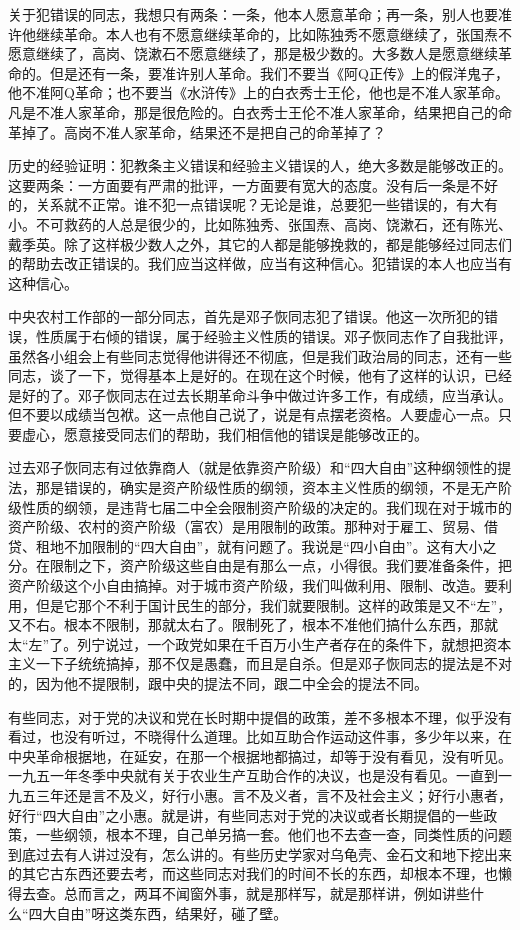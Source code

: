 关于犯错误的同志，我想只有两条：一条，他本人愿意革命；再一条，别人也要准许他继续革命。本人也有不愿意继续革命的，比如陈独秀不愿意继续了，张国焘不愿意继续了，高岗、饶漱石不愿意继续了，那是极少数的。大多数人是愿意继续革命的。但是还有一条，要准许别人革命。我们不要当《阿Q正传》上的假洋鬼子，他不准阿Q革命；也不要当《水浒传》上的白衣秀士王伦，他也是不准人家革命。凡是不准人家革命，那是很危险的。白衣秀士王伦不准人家革命，结果把自己的命革掉了。高岗不准人家革命，结果还不是把自己的命革掉了？

历史的经验证明：犯教条主义错误和经验主义错误的人，绝大多数是能够改正的。这要两条：一方面要有严肃的批评，一方面要有宽大的态度。没有后一条是不好的，关系就不正常。谁不犯一点错误呢？无论是谁，总要犯一些错误的，有大有小。不可救药的人总是很少的，比如陈独秀、张国焘、高岗、饶漱石，还有陈光、戴季英。除了这样极少数人之外，其它的人都是能够挽救的，都是能够经过同志们的帮助去改正错误的。我们应当这样做，应当有这种信心。犯错误的本人也应当有这种信心。

中央农村工作部的一部分同志，首先是邓子恢同志犯了错误。他这一次所犯的错误，性质属于右倾的错误，属于经验主义性质的错误。邓子恢同志作了自我批评，虽然各小组会上有些同志觉得他讲得还不彻底，但是我们政治局的同志，还有一些同志，谈了一下，觉得基本上是好的。在现在这个时候，他有了这样的认识，已经是好的了。邓子恢同志在过去长期革命斗争中做过许多工作，有成绩，应当承认。但不要以成绩当包袱。这一点他自己说了，说是有点摆老资格。人要虚心一点。只要虚心，愿意接受同志们的帮助，我们相信他的错误是能够改正的。

过去邓子恢同志有过依靠商人（就是依靠资产阶级）和“四大自由”这种纲领性的提法，那是错误的，确实是资产阶级性质的纲领，资本主义性质的纲领，不是无产阶级性质的纲领，是违背七届二中全会限制资产阶级的决定的。我们现在对于城市的资产阶级、农村的资产阶级（富农）是用限制的政策。那种对于雇工、贸易、借贷、租地不加限制的“四大自由”，就有问题了。我说是“四小自由”。这有大小之分。在限制之下，资产阶级这些自由是有那么一点，小得很。我们要准备条件，把资产阶级这个小自由搞掉。对于城市资产阶级，我们叫做利用、限制、改造。要利用，但是它那个不利于国计民生的部分，我们就要限制。这样的政策是又不“左”，又不右。根本不限制，那就太右了。限制死了，根本不准他们搞什么东西，那就太“左”了。列宁说过，一个政党如果在千百万小生产者存在的条件下，就想把资本主义一下子统统搞掉，那不仅是愚蠢，而且是自杀。但是邓子恢同志的提法是不对的，因为他不提限制，跟中央的提法不同，跟二中全会的提法不同。

有些同志，对于党的决议和党在长时期中提倡的政策，差不多根本不理，似乎没有看过，也没有听过，不晓得什么道理。比如互助合作运动这件事，多少年以来，在中央革命根据地，在延安，在那一个根据地都搞过，却等于没有看见，没有听见。一九五一年冬季中央就有关于农业生产互助合作的决议，也是没有看见。一直到一九五三年还是言不及义，好行小惠。言不及义者，言不及社会主义；好行小惠者，好行“四大自由”之小惠。就是讲，有些同志对于党的决议或者长期提倡的一些政策，一些纲领，根本不理，自己单另搞一套。他们也不去查一查，同类性质的问题到底过去有人讲过没有，怎么讲的。有些历史学家对乌龟壳、金石文和地下挖出来的其它古东西还要去考，而这些同志对我们的时间不长的东西，却根本不理，也懒得去查。总而言之，两耳不闻窗外事，就是那样写，就是那样讲，例如讲些什么“四大自由”呀这类东西，结果好，碰了壁。

